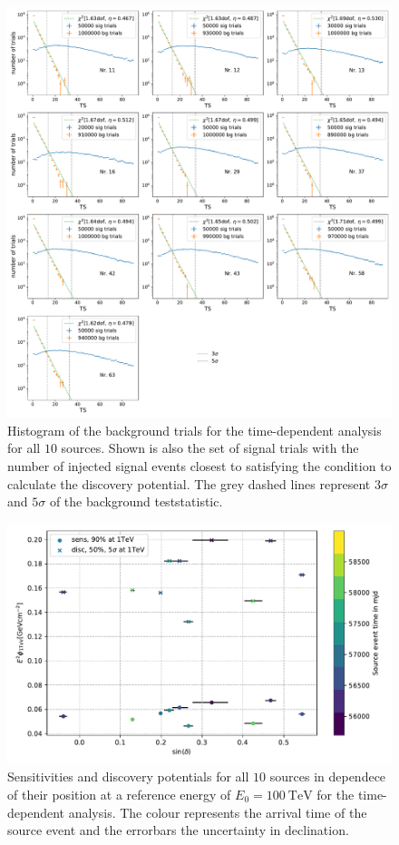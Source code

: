 \begin{figure}
    \centering
    \includegraphics[width=\linewidth]{Plots/appendix/9_years_gfu_gold_time_dep_sig_disc_ts.pdf}
    \caption{Histogram of the background trials for the time-dependent analysis for all $\num{10}$ sources. Shown is also the set of signal trials with the number of injected signal events closest to satisfying the condition to calculate the discovery potential. The grey dashed lines represent $\num{3}\sigma$ and $\num{5}\sigma$ of the background teststatistic.}
    \label{fig:time_dep_sig_disc_ts}
\end{figure}

\begin{figure}
    \centering
    \includegraphics[width=\linewidth]{Plots/appendix/time_dep_sens_disc_dec_time_2.pdf}
    \caption{Sensitivities and discovery potentials for all $\num{10}$ sources in dependece of their position at a reference energy of $E_0 = \SI{100}{\tera\electronvolt}$ for the time-dependent analysis. The colour represents the arrival time of the source event and the errorbars the uncertainty in declination.}
    \label{fig:sens_disc_time_dep_dec}
\end{figure}

